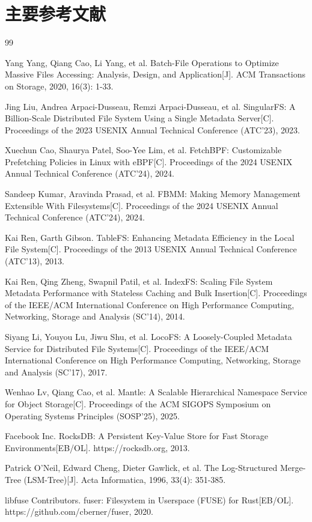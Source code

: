 \documentclass[supercite]{Hust-undergraduate-kaiti}
\theoremstyle{definition}
\begin{document}
\section{主要参考文献}
\renewcommand{\refname}{}
\vspace{-2em}
\begin{thebibliography}{99}

Yang Yang, Qiang Cao, Li Yang, et al. Batch-File Operations to Optimize Massive Files Accessing: Analysis, Design, and Application[J]. ACM Transactions on Storage, 2020, 16(3): 1-33.

Jing Liu, Andrea Arpaci-Dusseau, Remzi Arpaci-Dusseau, et al. SingularFS: A Billion-Scale Distributed File System Using a Single Metadata Server[C]. Proceedings of the 2023 USENIX Annual Technical Conference (ATC'23), 2023.

Xuechun Cao, Shaurya Patel, Soo-Yee Lim, et al. FetchBPF: Customizable Prefetching Policies in Linux with eBPF[C]. Proceedings of the 2024 USENIX Annual Technical Conference (ATC'24), 2024.

Sandeep Kumar, Aravinda Prasad, et al. FBMM: Making Memory Management Extensible With Filesystems[C]. Proceedings of the 2024 USENIX Annual Technical Conference (ATC'24), 2024.

Kai Ren, Garth Gibson. TableFS: Enhancing Metadata Efficiency in the Local File System[C]. Proceedings of the 2013 USENIX Annual Technical Conference (ATC'13), 2013.

Kai Ren, Qing Zheng, Swapnil Patil, et al. IndexFS: Scaling File System Metadata Performance with Stateless Caching and Bulk Insertion[C]. Proceedings of the IEEE/ACM International Conference on High Performance Computing, Networking, Storage and Analysis (SC'14), 2014.

Siyang Li, Youyou Lu, Jiwu Shu, et al. LocoFS: A Loosely-Coupled Metadata Service for Distributed File Systems[C]. Proceedings of the IEEE/ACM International Conference on High Performance Computing, Networking, Storage and Analysis (SC'17), 2017.

Wenhao Lv, Qiang Cao, et al. Mantle: A Scalable Hierarchical Namespace Service for Object Storage[C]. Proceedings of the ACM SIGOPS Symposium on Operating Systems Principles (SOSP'25), 2025.

Facebook Inc. RocksDB: A Persistent Key-Value Store for Fast Storage Environments[EB/OL]. https://rocksdb.org, 2013.

Patrick O'Neil, Edward Cheng, Dieter Gawlick, et al. The Log-Structured Merge-Tree (LSM-Tree)[J]. Acta Informatica, 1996, 33(4): 351-385.

libfuse Contributors. fuser: Filesystem in Userspace (FUSE) for Rust[EB/OL]. https://github.com/cberner/fuser, 2020.

\end{thebibliography}
\end{document}
